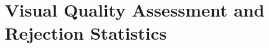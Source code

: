 









\section{Visual Quality Assessment and Rejection Statistics}
\label{sec:image_statistics}

